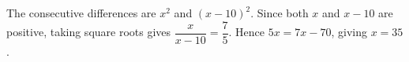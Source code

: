 The consecutive differences are $x^2$ and $(x-10)^2$. Since both $x$ and $x-10$ are positive, taking square roots gives $\dfrac{x}{x-10}=\dfrac{7}{5}$. Hence $5x=7x-70$, giving $\boxed{x=35}$.
